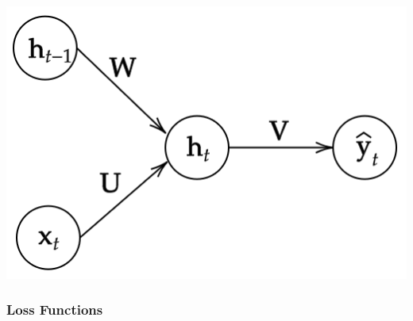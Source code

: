 \documentclass{article}
\theoremstyle{definition}
\theoremstyle{remark}
\theoremstyle{definition}
\begin{document}
\begin{center}
    \includegraphics[scale=0.3]{Images/RNNs/RNN_as_MLP.png}
\end{center}

\subsubsection{Loss Functions}
\end{document}
